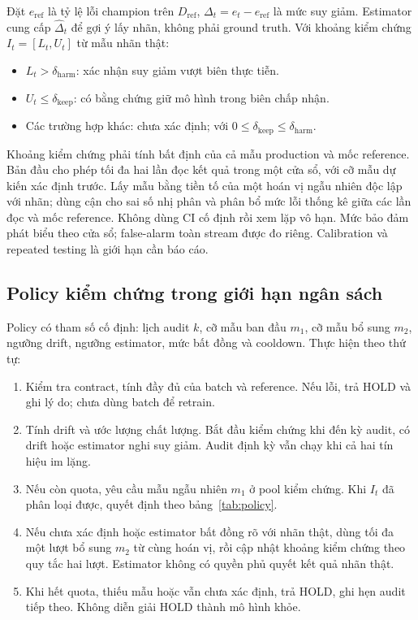 Đặt $e_{\mathrm{ref}}$ là tỷ lệ lỗi champion trên $D_{\mathrm{ref}}$, $\Delta_t=e_t-e_{\mathrm{ref}}$ là mức suy giảm. Estimator cung cấp $\widehat{\Delta}_t$ để gợi ý lấy nhãn, không phải ground truth. Với khoảng kiểm chứng $I_t=[L_t,U_t]$ từ mẫu nhãn thật:
\begin{itemize}
  \item $L_t>\delta_{\mathrm{harm}}$: xác nhận suy giảm vượt biên thực tiễn.
  \item $U_t\le\delta_{\mathrm{keep}}$: có bằng chứng giữ mô hình trong biên chấp nhận.
  \item Các trường hợp khác: chưa xác định; với $0\le\delta_{\mathrm{keep}}\le\delta_{\mathrm{harm}}$.
\end{itemize}
Khoảng kiểm chứng phải tính bất định của cả mẫu production và mốc reference. Bản đầu cho phép tối đa hai lần đọc kết quả trong một cửa sổ, với cỡ mẫu dự kiến xác định trước. Lấy mẫu bằng tiền tố của một hoán vị ngẫu nhiên độc lập với nhãn; dùng cận cho sai số nhị phân và phân bổ mức lỗi thống kê giữa các lần đọc và mốc reference. Không dùng CI cố định rồi xem lặp vô hạn. Mức bảo đảm phát biểu theo cửa sổ; false-alarm toàn stream được đo riêng. Calibration và repeated testing là giới hạn cần báo cáo.

\subsection{Policy kiểm chứng trong giới hạn ngân sách}
Policy có tham số cố định: lịch audit $k$, cỡ mẫu ban đầu $m_1$, cỡ mẫu bổ sung $m_2$, ngưỡng drift, ngưỡng estimator, mức bất đồng và cooldown. Thực hiện theo thứ tự:
\begin{enumerate}
  \item Kiểm tra contract, tính đầy đủ của batch và reference. Nếu lỗi, trả HOLD và ghi lý do; chưa dùng batch để retrain.
  \item Tính drift và ước lượng chất lượng. Bắt đầu kiểm chứng khi đến kỳ audit, có drift hoặc estimator nghi suy giảm. Audit định kỳ vẫn chạy khi cả hai tín hiệu im lặng.
  \item Nếu còn quota, yêu cầu mẫu ngẫu nhiên $m_1$ ở pool kiểm chứng. Khi $I_t$ đã phân loại được, quyết định theo bảng~\ref{tab:policy}.
  \item Nếu chưa xác định hoặc estimator bất đồng rõ với nhãn thật, dùng tối đa một lượt bổ sung $m_2$ từ cùng hoán vị, rồi cập nhật khoảng kiểm chứng theo quy tắc hai lượt. Estimator không có quyền phủ quyết kết quả nhãn thật.
  \item Khi hết quota, thiếu mẫu hoặc vẫn chưa xác định, trả HOLD, ghi hẹn audit tiếp theo. Không diễn giải HOLD thành mô hình khỏe.
\end{enumerate}

